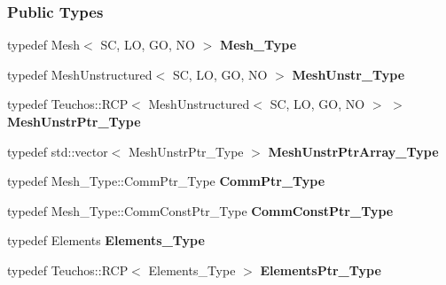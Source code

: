 \subsubsection*{Public Types}
\begin{DoxyCompactItemize}
\item 
\mbox{\label{classFEDD_1_1RefinementFactory_a1e469aabe3952e2cd5797236ba2d80b7}} 
typedef Mesh$<$ SC, LO, GO, NO $>$ {\bfseries Mesh\+\_\+\+Type}
\item 
\mbox{\label{classFEDD_1_1RefinementFactory_aa284ad39ff56f20f0e0fb1736a706ed7}} 
typedef Mesh\+Unstructured$<$ SC, LO, GO, NO $>$ {\bfseries Mesh\+Unstr\+\_\+\+Type}
\item 
\mbox{\label{classFEDD_1_1RefinementFactory_a5dfa0d2bb61c7c09eb7b752b8353cf16}} 
typedef Teuchos\+::\+R\+CP$<$ Mesh\+Unstructured$<$ SC, LO, GO, NO $>$ $>$ {\bfseries Mesh\+Unstr\+Ptr\+\_\+\+Type}
\item 
\mbox{\label{classFEDD_1_1RefinementFactory_a049d8b7e6d1b66326cb5f7576e94a517}} 
typedef std\+::vector$<$ Mesh\+Unstr\+Ptr\+\_\+\+Type $>$ {\bfseries Mesh\+Unstr\+Ptr\+Array\+\_\+\+Type}
\item 
\mbox{\label{classFEDD_1_1RefinementFactory_aa7b0ab20b8659e451330976480944e37}} 
typedef Mesh\+\_\+\+Type\+::\+Comm\+Ptr\+\_\+\+Type {\bfseries Comm\+Ptr\+\_\+\+Type}
\item 
\mbox{\label{classFEDD_1_1RefinementFactory_a96e4037869de7d2d55b318fac0dd68fe}} 
typedef Mesh\+\_\+\+Type\+::\+Comm\+Const\+Ptr\+\_\+\+Type {\bfseries Comm\+Const\+Ptr\+\_\+\+Type}
\item 
\mbox{\label{classFEDD_1_1RefinementFactory_a0b053e56590f8e148fb1b3f48c68141b}} 
typedef Elements {\bfseries Elements\+\_\+\+Type}
\item 
\mbox{\label{classFEDD_1_1RefinementFactory_a655120e9571ded2c66d441c9a1552038}} 
typedef Teuchos\+::\+R\+CP$<$ Elements\+\_\+\+Type $>$ {\bfseries Elements\+Ptr\+\_\+\+Type}

\end{DoxyCompactItemize}
